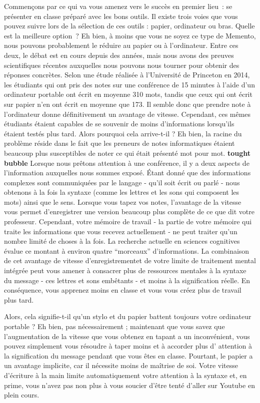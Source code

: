 Commençons par ce qui va vous amenez vers le succès en premier lieu~: se
présenter en classe préparé avec les bons outils. Il existe trois voies
que vous pouvez suivre lors de la sélection de ces outils : papier,
ordinateur ou bras. Quelle est la meilleure option~? Eh bien, à moins
que vous ne soyez ce type de Memento, nous pouvons probablement le
réduire au papier ou à l'ordinateur. Entre ces deux, le débat est en
cours depuis des années, mais nous avons des preuves scientifiques
récentes auxquelles nous pouvons nous tourner pour obtenir des réponses
concrètes. Selon une étude réalisée à l'Université de Princeton en 2014,
les étudiants qui ont pris des notes sur une conférence de 15 minutes à
l'aide d'un ordinateur portable ont écrit en moyenne 310 mots, tandis
que ceux qui ont écrit sur papier n'en ont écrit en moyenne que 173. Il
semble donc que prendre note à l'ordinateur donne définitivement un
avantage de vitesse. Cependant, ces mêmes étudiants étaient capables de
se souvenir de moins d'informations lorsqu'ils étaient testés plus tard.
Alors pourquoi cela arrive-t-il ? Eh bien, la racine du problème réside
dans le fait que les preneurs de notes informatiques étaient beaucoup
plus susceptibles de noter ce qui était présenté mot pour mot.
\textbf{tought bubble} Lorsque nous prêtons attention à une conférence,
il y a deux aspects de l'information auxquelles nous sommes exposé.
Étant donné que des informations complexes sont communiquées par le
langage - qu'il soit écrit ou parlé - nous obtenons à la fois la syntaxe
(comme les lettres et les sons qui composent les mots) ainsi que le
sens. Lorsque vous tapez vos notes, l'avantage de la vitesse vous permet
d'enregistrer une version beaucoup plus complète de ce que dit votre
professeur. Cependant, votre mémoire de travail - la partie de votre
mémoire qui traite les informations que vous recevez actuellement - ne
peut traiter qu'un nombre limité de choses à la fois. La recherche
actuelle en sciences cognitives évalue ce montant à environ quatre
``morceaux'' d'informations. La combinaison de cet avantage de vitesse
d'enregistrementet de votre limite de traitement mental intégrée peut
vous amener à consacrer plus de ressources mentales à la syntaxe du
message - ces lettres et sons embêtants - et moins à la signification
réelle. En conséquence, vous apprenez moins en classe et vous vous créez
plus de travail plus tard.

Alors, cela signifie-t-il qu'un stylo et du papier battent toujours
votre ordinateur portable ? Eh bien, pas nécessairement ; maintenant que
vous savez que l'augmentation de la vitesse que vous obtenez en tapant a
un inconvénient, vous pouvez simplement vous résoudre à taper moins et à
accorder plus d' attention à la signification du message pendant que
vous êtes en classe. Pourtant, le papier a un avantage implicite, car il
nécessite moins de maîtrise de soi. Votre vitesse d'écriture à la main
limite automatiquement votre attention à la syntaxe et, en prime, vous
n'avez pas non plus à vous soucier d'être tenté d'aller sur Youtube en
plein cours.


